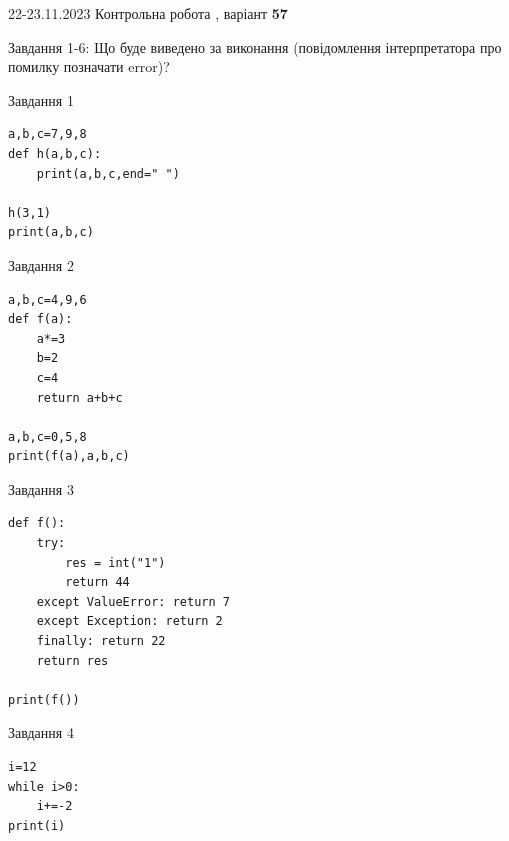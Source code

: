 \documentclass[12pt, ukrainian]{article}
\begin{document}
{{22-23.11.2023 Контрольна робота , варіант  \No \textbf { 57 }\par}}
{

Завдання 1-6: Що буде виведено за виконання (повідомлення інтерпретатора про помилку позначати error)?


\begin{minipage}[t]{9.7cm}                
{\begin{center}Завдання {1}\end{center}}
\begin{verbatim}
a,b,c=7,9,8
def h(a,b,c):
    print(a,b,c,end=" ")

h(3,1)
print(a,b,c)
\end{verbatim}     
\end{minipage}
\vline \hspace{8mm}
\begin{minipage}[t]{8.0cm}                
{\begin{center}Завдання {2}\end{center}}
\begin{verbatim}
a,b,c=4,9,6
def f(a):
    a*=3
    b=2
    c=4
    return a+b+c

a,b,c=0,5,8
print(f(a),a,b,c)
\end{verbatim}     
\end{minipage}

\vspace{15mm}
\begin{minipage}[t]{9.7cm}                
{\begin{center}Завдання {3}\end{center}}
\begin{verbatim}
def f():
    try:
        res = int("1")
        return 44
    except ValueError: return 7
    except Exception: return 2
    finally: return 22
    return res

print(f())
\end{verbatim}     
\end{minipage}
\vline \hspace{8mm}
\begin{minipage}[t]{8.0cm}                
{\begin{center}Завдання {4}\end{center}}
\begin{verbatim}
i=12
while i>0:
    i+=-2
print(i)
\end{verbatim}     
\end{minipage}

}
\end{document}
